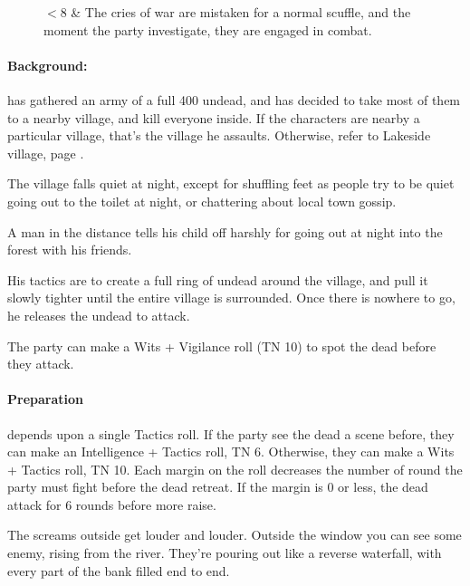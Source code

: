\begin{multicols}{2}
\begin{figure*}[t]
\begin{rollchart}
  $<8$ & The cries of war are mistaken for a normal scuffle, and the moment the party investigate, they are engaged in combat. \\

\end{rollchart}
\end{figure*}

\paragraph{Background:}
 has gathered an army of a full 400 undead, and has decided to take most of them to a nearby village, and kill everyone inside.
If the characters are nearby a particular village, that's the village he assaults.
Otherwise, refer to Lakeside village, page \pageref{lakeside}.

\begin{boxtext}
  The village falls quiet at night, except for shuffling feet as people try to be quiet going out to the toilet at night, or chattering about local town gossip.

  A man in the distance tells his child off harshly for going out at night into the forest with his friends.
\end{boxtext}

His tactics are to create a full ring of undead around the village, and pull it slowly tighter until the entire village is surrounded.
Once there is nowhere to go, he releases the undead to attack.

The party can make a Wits + Vigilance roll (TN 10) to spot the dead before they attack.

\paragraph{Preparation} depends upon a single Tactics roll.
If the party see the dead a scene before, they can make an Intelligence + Tactics roll, TN 6.
Otherwise, they can make a Wits + Tactics roll, TN 10.
Each margin on the roll decreases the number of round the party must fight before the dead retreat.
If the margin is 0 or less, the dead attack for 6 rounds before more raise.

\begin{boxtext}

  The screams outside get louder and louder.
  Outside the window you can see some enemy, rising from the river.
  They're pouring out like a reverse waterfall, with every part of the bank filled end to end.


\end{boxtext}
\end{multicols}
